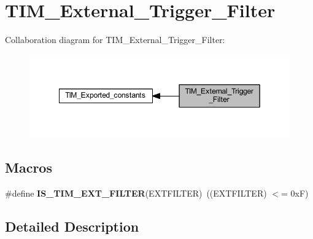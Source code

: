 \hypertarget{group___t_i_m___external___trigger___filter}{}\section{T\+I\+M\+\_\+\+External\+\_\+\+Trigger\+\_\+\+Filter}
\label{group___t_i_m___external___trigger___filter}
Collaboration diagram for T\+I\+M\+\_\+\+External\+\_\+\+Trigger\+\_\+\+Filter\+:
\nopagebreak
\begin{figure}[H]
\begin{center}
\leavevmode
\includegraphics[width=349pt]{group___t_i_m___external___trigger___filter}
\end{center}
\end{figure}
\subsection*{Macros}
\begin{DoxyCompactItemize}
\item 
\mbox{\label{group___t_i_m___external___trigger___filter_ga500df0646edcf07316a55a652502ca87}} 
\#define {\bfseries I\+S\+\_\+\+T\+I\+M\+\_\+\+E\+X\+T\+\_\+\+F\+I\+L\+T\+ER}(E\+X\+T\+F\+I\+L\+T\+ER)~((E\+X\+T\+F\+I\+L\+T\+ER) $<$= 0x\+F)
\end{DoxyCompactItemize}


\subsection{Detailed Description}
